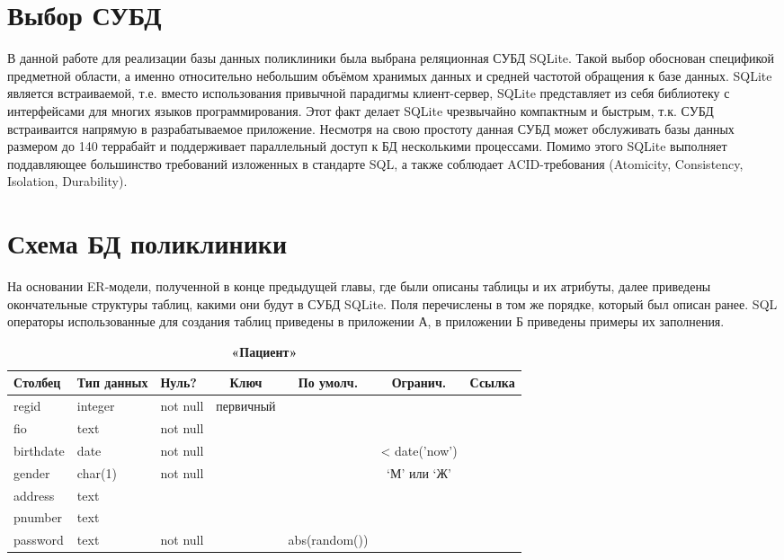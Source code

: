 \documentclass[14pt,a4paper,russian]{extreport}
\begin{document}
\section{Выбор СУБД}
В данной работе для реализации базы данных поликлиники была выбрана реляционная СУБД
SQLite. Такой выбор обоснован спецификой предметной области, а именно относительно небольшим
объёмом хранимых данных и средней частотой обращения к базе данных. SQLite является
встраиваемой, т.е. вместо использования привычной парадигмы клиент-сервер, SQLite представляет из
себя библиотеку с интерфейсами для многих языков программирования. Этот факт делает SQLite
чрезвычайно компактным и быстрым, т.к. СУБД встраиваится напрямую в разрабатываемое приложение.
Несмотря на свою простоту данная СУБД может обслуживать базы данных размером до 140 террабайт и
поддерживает параллельный доступ к БД несколькими процессами. Помимо этого SQLite выполняет
поддавляющее большинство требований изложенных в стандарте SQL, а также соблюдает ACID-требования
(Atomicity, Consistency, Isolation, Durability).\cite{sqlite}


\section{Схема БД поликлиники}
На основании ER-модели, полученной в конце предыдущей главы, где были описаны таблицы и их атрибуты,
далее приведены окончательные структуры таблиц, какими они будут в СУБД SQLite. Поля перечислены в
том же порядке, который был описан ранее. SQL операторы
использованные для создания таблиц приведены в приложении А, в приложении Б приведены примеры их
заполнения.


\begin{table}[h]
    \caption{ } 
    \begin{subtable}[t]{\textwidth}
        \caption{\textbf{«Пациент»}}
    \begin{tabularx}{\textwidth}{| X | X | X | c | c | c | X |}
        \hline
        \textbf{Столбец} & \textbf{Тип данных} & \textbf{Нуль?} & \textbf{Ключ} & \textbf{По
        умолч.} & \textbf{Огранич.} & \textbf{Ссылка} \\ \hline
        regid & integer & not null & первичный & & & \\ \hline
        fio & text & not null & & & & \\ \hline
        birthdate & date & not null & & & < date('now') & \\ \hline
        gender & char(1) & not null & & & `М' или `Ж' & \\ \hline
        address & text & & & & & \\ \hline
        pnumber & text & & & & & \\ \hline
        password & text & not null & & abs(random()) & & \\ \hline
    \end{tabularx}
    \end{subtable}
    \label{table:pat}
\end{table}
\end{document}
